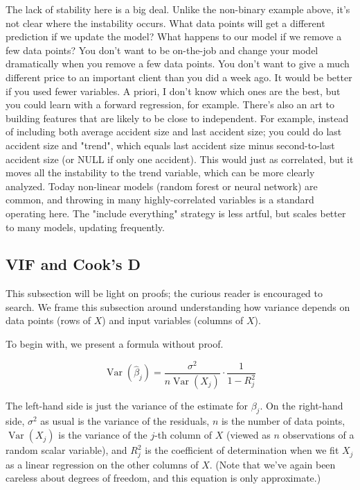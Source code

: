 \documentclass{amsbook}
\begin{document}
The lack of stability here is a big deal.  Unlike the non-binary example above, it's not clear where the instability occurs.  What data points will get a different prediction if we update the model?  What happens to our model if we remove a few data points?  You don't want to be on-the-job and change your model dramatically when you remove a few data points.  You don't want to give a much different price to an important client than you did a week ago.  It would be better if you used fewer variables.  A priori, I don't know which ones are the best, but you could learn with a forward regression, for example.  There's also an art to building features that are likely to be close to independent.  For example, instead of including both average accident size and last accident size; you could do last accident size and "trend", which equals last accident size minus second-to-last accident size (or NULL if only one accident).  This would just as correlated, but it moves all the instability to the trend variable, which can be more clearly analyzed.  Today non-linear models (random forest or neural network) are common, and throwing in many highly-correlated variables is a standard operating here.  The "include everything" strategy is less artful, but scales better to many models, updating frequently.

\subsection{VIF and Cook's D}

This subsection will be light on proofs; the curious reader is encouraged to search.  We frame this subsection around understanding how variance depends on data points (rows of $X$) and input variables (columns of $X$).

To begin with, we present a formula without proof.

$$
\operatorname{Var}\left(\hat\beta_j\right)=\frac{\sigma^2}{n\operatorname{Var}\left(X_j\right)}\cdot\frac{1}{1-R_j^2}
$$

The left-hand side is just the variance of the estimate for $\beta_j$.  On the right-hand side, $\sigma^2$ as usual is the variance of the residuals, $n$ is the number of data points, $\operatorname{Var}\left(X_j\right)$ is the variance of the $j$-th column of $X$ (viewed as $n$ observations of a random scalar variable), and $R_j^2$ is the coefficient of determination when we fit $X_j$ as a linear regression on the other columns of $X$.  (Note that we've again been careless about degrees of freedom, and this equation is only approximate.)
\end{document}
